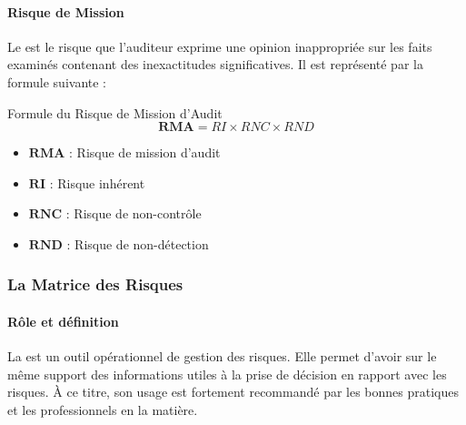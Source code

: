 \paragraph{Risque de Mission}
Le  est le risque que l'auditeur exprime une opinion
inappropriée sur les faits examinés contenant des inexactitudes significatives. Il est
représenté par la formule suivante :

\begin{boiteTheoreme}{Formule du Risque de Mission d'Audit}
\[
\mathbf{RMA} = RI \times RNC \times RND
\]
\begin{itemize}
  \item $\mathbf{RMA}$ : Risque de mission d'audit
  \item $\mathbf{RI}$ : Risque inhérent
  \item $\mathbf{RNC}$ : Risque de non-contrôle
  \item $\mathbf{RND}$ : Risque de non-détection
\end{itemize}
\end{boiteTheoreme}

\subsubsection{La Matrice des Risques}

\paragraph{Rôle et définition}
La  est un outil opérationnel de gestion des risques.
Elle permet d'avoir sur le même support des informations utiles à la prise de décision
en rapport avec les risques. À ce titre, son usage est fortement recommandé par les
bonnes pratiques et les professionnels en la matière.

